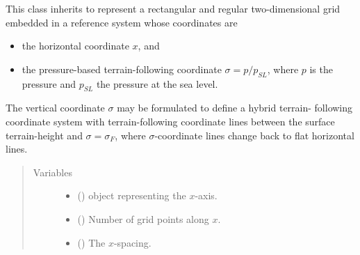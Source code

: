 \documentclass[letterpaper,10pt,english]{sphinxmanual}
\begin{document}
\begin{fulllineitems}
\label{\detokenize{api:grids.sigma.Sigma2d}}
This class inherits {\hyperref[\detokenize{api:grids.xz_grid.XZGrid}]{}} to represent a rectangular and regular
two-dimensional grid embedded in a reference system whose coordinates are
\begin{itemize}
\item {} 
the horizontal coordinate \(x\), and

\item {} 
the pressure-based terrain-following coordinate \(\sigma = p / p_{SL}\),                  where \(p\) is the pressure and \(p_{SL}\) the pressure at the                  sea level.

\end{itemize}

The vertical coordinate \(\sigma\) may be formulated to define a hybrid terrain-
following coordinate system with terrain-following coordinate lines between the
surface terrain-height and \(\sigma = \sigma_F\), where \(\sigma\)-coordinate
lines change back to flat horizontal lines.
\begin{quote}\begin{description}
\item[{Variables}] \leavevmode\begin{itemize}
\item {} 
{\hyperref[\detokenize{api:grids.xyz_grid.XYZGrid.x}]{}} () \textendash{} {\hyperref[\detokenize{api:grids.axis.Axis}]{}} object representing the \(x\)-axis.

\item {} 
{\hyperref[\detokenize{api:grids.xyz_grid.XYZGrid.nx}]{}} () \textendash{} Number of grid points along \(x\).

\item {} 
{\hyperref[\detokenize{api:grids.xyz_grid.XYZGrid.dx}]{}} () \textendash{} The \(x\)-spacing.


\end{itemize}
\end{description}
\end{quote}
\end{fulllineitems}
\end{document}
